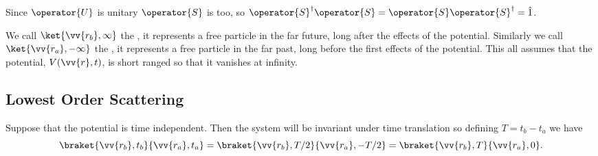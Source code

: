 \documentclass[fleqn]{NotesClass}
\newcommand*{\idop}{\hat{1}}
\newcommand*{\hermit}{\dagger}
\begin{document}
    Since \(\operator{U}\) is unitary \(\operator{S}\) is too, so \(\operator{S}^\hermit \operator{S} = \operator{S}\operator{S}^\hermit = \idop\).
    
    We call \(\ket{\vv{r_b}, \infty}\) the , it represents a free particle in the far future, long after the effects of the potential.
    Similarly we call \(\ket{\vv{r_a}, -\infty}\) the , it represents a free particle in the far past, long before the first effects of the potential.
    This all assumes that the potential, \(V(\vv{r}, t)\), is short ranged so that it vanishes at infinity.
    
    \subsection{Lowest Order Scattering}
    Suppose that the potential is time independent.
    Then the system will be invariant under time translation so defining \(T = t_b - t_a\) we have
    \begin{equation}
        \braket{\vv{r_b}, t_b}{\vv{r_a}, t_a} = \braket{\vv{r_b}, T/2}{\vv{r_a}, -T/2} = \braket{\vv{r_b}, T}{\vv{r_a}, 0}.
    \end{equation}
    
\end{document}
